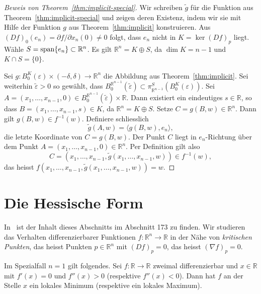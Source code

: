 \documentclass[../main.tex]{subfiles}
\begin{document}
\begin{proof}[Beweis von Theorem~\ref{thm:implicit-special}]
  Wir schreiben $\widetilde g$ für die Funktion aus
  Theorem~\ref{thm:implicit-special}
  und zeigen deren Existenz, indem wir sie mit Hilfe der Funktion
  $g$ aus Theorem~\ref{thm:implicit} konstruieren.
  Aus ${(Df)}_0(e_n) = \partial f / \partial x_n ( 0 ) \neq 0$
  folgt, dass  $e_n$ nicht in $K = \ker {(Df)}_p$ liegt.
  Wähle $S = \operatorname{span} \{ e_n \} \subset \mathbb{R}^n$.
  Es gilt $\mathbb{R}^n = K \oplus S$, da
  $\dim K = n-1$ und $K \cap S = \{0\}$.

  Sei $g \colon B_0^K(\varepsilon) \times (-\delta, \delta) \to
  \mathbb{R}^n$ die Abbildung aus  Theorem~\ref{thm:implicit}.
  Sei
  weiterhin $\widetilde \varepsilon > 0$ so gewählt, dass
  $B_0^{\mathbb{R}^{n-1}}(\widetilde \varepsilon)
  \subset \pi_{\mathbb{R}^{n-1}}^S(B_0^K(\varepsilon))$.
  Sei $A = (x_1, \dots, x_{n-1}, 0) \in B_0^{\mathbb{R}^{n-1}}(\widetilde
  \varepsilon) \times \mathbb{R}$.
  Dann existiert ein eindeutiges $s \in \mathbb{R}$, so dass
  $B = (x_1, \dots, x_{n-1}, s) \in K$,
  da $\mathbb{R}^{n} = K \oplus S$.
  Setze $C = g(B, w) \in \mathbb{R}^n$.
  Dann gilt $g(B, w) \in f^{-1}(w)$.
  Definiere schliesslich
  \[\widetilde g (A, w) = \langle g(B, w), e_n \rangle,\]
  die letzte Koordinate von $C = g(B, w)$.
  Der Punkt $C$ liegt in $e_n$-Richtung über dem Punkt $A
  = (x_1, \dots, x_{n-1}, 0) \in \mathbb{R}^n$.
  Per Definition gilt also
  \[
  C = (x_1, \dots, x_{n-1}, \widetilde g(x_1, \dots, x_{n-1}, w))
  \in f^{-1}(w),
  \]
  das heisst
  $f(x_1, \dots, x_{n-1}, \widetilde g(x_1, \dots, x_{n-1}, w)) = w$.
\end{proof}

\section{Die Hessische Form}
In~\cite{heuser} ist der Inhalt dieses Abschnitts im Abschnitt 173
zu finden.
Wir studieren das Verhalten differenzierbarer Funktionen
$f \colon\mathbb{R}^n \to \mathbb{R}$
in der Nähe von \emph{kritischen Punkten},
das heisst Punkten $p \in \mathbb{R}^n$
mit ${(Df)}_p = 0$, das heisst  ${(\nabla f)}_p = 0$.

Im Spezialfall
$n = 1$
gilt folgendes. Sei $f \colon \mathbb{R} \to \mathbb{R}$
zweimal differenzierbar und $x \in \mathbb{R}$
mit $f'(x) = 0$ und $f''(x) > 0$ (respektive $f''(x) < 0$).
Dann hat $f$ an der Stelle $x$ ein lokales Minimum
(respektive ein lokales Maximum).
\end{document}
